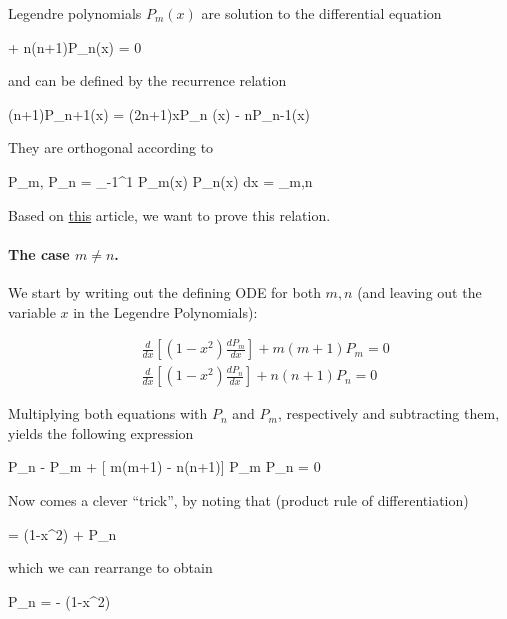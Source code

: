 
Legendre polynomials $P_m(x)$ are solution to the differential equation

\bee
{}  + n(n+1)P_n(x) = 0
\eee

and can be defined by the recurrence relation

\bee
(n+1)P_{n+1}(x) = (2n+1)xP_n (x) - nP_{n-1}(x)
\eee

They are orthogonal according to

\bee
\langle P_m, P_n \rangle = \int_{-1}^1 P_m(x) P_n(x) dx =  \delta_{m,n}
\eee


Based on \href{https://math.stackexchange.com/questions/2499216/legendre-polynomial-orthogonality-integral?noredirect=1&lq=1}{this} article, we want to prove this relation.

\paragraph{The case $m \neq n$.} We start by writing out the defining ODE for both $m, n$ (and leaving out the variable $x$ in the Legendre Polynomials):

\begin{align*}
  &\frac{d}{dx} \left[ (1-x^2) \frac{dP_m}{dx}  \right] + m(m+1)P_m = 0 \\
  &\frac{d}{dx} \left[ (1-x^2) \frac{dP_n}{dx}  \right] + n(n+1)P_n = 0
\end{align*}

Multiplying both equations with $P_n$ and $P_m$, respectively and subtracting them, yields the following expression

\be\label{20180912:eq1}
P_n   - P_m   + [ m(m+1) - n(n+1)] P_m P_n = 0
\ee

Now comes a clever ``trick'', by noting that (product rule of differentiation)

\bee
{}  =  (1-x^2)  + P_n  
\eee

which we can rearrange to obtain

\bee
P_n   =   -  (1-x^2) 
\eee

